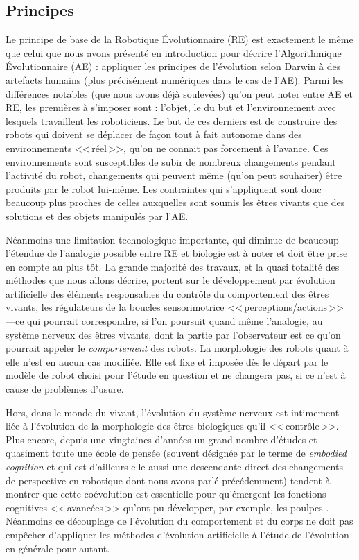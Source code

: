 \subsection{Principes}
Le principe de base de la Robotique \'Evolutionnaire (RE) est exactement le même que celui que nous avons présenté en introduction pour décrire l'Algorithmique \'Evolutionnaire (AE) : appliquer les principes de l'évolution selon Darwin à des artefacts humains (plus précisément numériques dans le cas de l'AE).
Parmi les différences notables (que nous avons déjà soulevées) qu'on peut noter entre AE et RE, les premières à s'imposer sont : l'objet, le du but et l'environnement avec lesquels travaillent les roboticiens. Le but de ces derniers est de construire des robots qui doivent se déplacer de façon tout à fait autonome dans des environnements <<\,réel\,>>, qu'on ne connait pas forcement à l'avance. Ces environnements sont susceptibles de subir de nombreux changements pendant l'activité du robot, changements qui peuvent même (qu'on peut souhaiter) être produits par le robot lui-même. Les contraintes qui s'appliquent sont donc beaucoup plus proches de celles auxquelles sont soumis les êtres vivants que des solutions et des objets manipulés par l'AE.

Néanmoins une limitation technologique importante, qui diminue de beaucoup l'étendue de l'analogie possible entre RE et biologie est à noter et doit être prise en compte au plus tôt. La grande majorité des travaux, et la quasi totalité des méthodes que nous allons décrire, portent sur le développement par évolution artificielle des éléments responsables du contrôle du comportement des êtres vivants, les régulateurs de la boucles sensorimotrice <<\,perceptions/actions\,>> ---ce qui pourrait correspondre, si l'on poursuit quand même l'analogie, au système nerveux des êtres vivants, dont la partie par l'observateur est ce qu'on pourrait appeler le \emph{comportement} des robots. La morphologie des robots quant à elle n'est en aucun cas modifiée. Elle est fixe et imposée dès le départ par le modèle de robot choisi pour l'étude en question et ne changera pas, si ce n'est à cause de problèmes d'usure.

Hors, dans le monde du vivant, l'évolution du système nerveux est intimement liée à l'évolution de la morphologie des êtres biologiques qu'il <<\,contrôle\,>>. Plus encore, depuis une vingtaines d'années un grand nombre d'études et quasiment toute une école de pensée (souvent désignée par le terme de \emph{embodied cognition} et qui est d'ailleurs elle aussi une descendante direct des changements de perspective en robotique dont nous avons parlé précédemment) tendent à montrer que cette coévolution est essentielle pour qu'émergent les fonctions cognitives <<\,avancées\,>> qu'ont pu développer, par exemple, les poulpes \citep{pfeifer2006howthebodyshapesthewaywethink}. Néanmoins ce découplage de l'évolution du comportement et du corps ne doit pas empêcher d'appliquer les méthodes d'évolution artificielle à l'étude de l'évolution en générale pour autant.

